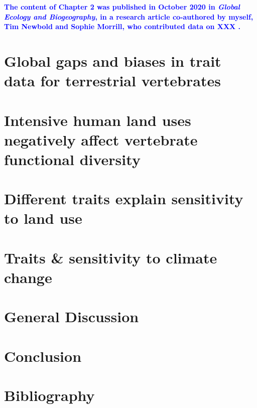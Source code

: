 \documentclass[11pt]{report}
\renewcommand{\baselinestretch}{1.5}
\begin{document}
\begin{refsection}
\textcolor{blue}{\textbf{The content of Chapter 2 was published in October 2020 in \textit{Global Ecology and Biogeography}, in a research article co-authored by myself, Tim Newbold and Sophie Morrill, who contributed data on XXX \citep{Etard2020}.}}

\chapter{Global gaps and biases in trait data for terrestrial vertebrates}


\chapter{Intensive human land uses negatively affect vertebrate functional diversity}


\chapter{Different traits explain sensitivity to land use}
%

\chapter{Traits \& sensitivity to climate change}
%

\chapter{General Discussion}



\chapter{Conclusion}


\clearpage
{}
\chapter*{Bibliography}
\renewcommand{\baselinestretch}{1}
\printbibliography[heading=none]

\end{refsection}
\end{document}
